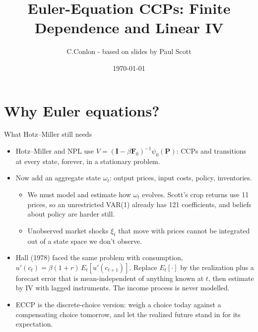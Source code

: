\documentclass[aspectratio=169,11pt]{beamer}
\title{Euler-Equation CCPs: Finite Dependence and Linear IV}
\author{C.Conlon - based on slides by Paul Scott}
\institute{Grad IO}
\date{\today}
\begin{document}
\begin{frame}
\titlepage
\end{frame}

\section{Why Euler equations?}

\begin{frame}{What Hotz--Miller still needs}
\small
\begin{itemize}
\item Hotz--Miller and NPL use $V = (\symbf I - \beta \symbf F_0)^{-1}\psi_0(\symbf P)$: CCPs and transitions at \alert{every} state, forever, in a stationary problem.
\item Now add an aggregate state $\omega_t$: output prices, input costs, policy, inventories.
\begin{itemize}
\item We must model and estimate how $\omega_t$ evolves. Scott's crop returns use 11 prices, so an unrestricted VAR(1) already has 121 coefficients, and beliefs about policy are harder still.
\item Unobserved market shocks $\xi_t$ that move with prices cannot be integrated out of a state space we don't observe.
\end{itemize}
\item Hall (1978) faced the same problem with consumption, $u'(c_t) = \beta(1+r)\,E_t[u'(c_{t+1})]$. Replace $E_t[\cdot]$ by the realization plus a forecast error that is mean-independent of anything known at $t$, then estimate by IV with lagged instruments. The income process is never modelled.
\item \alert{ECCP} is the discrete-choice version: weigh a choice today against a compensating choice tomorrow, and let the realized future stand in for its expectation.
\end{itemize}
\end{frame}
\end{document}
